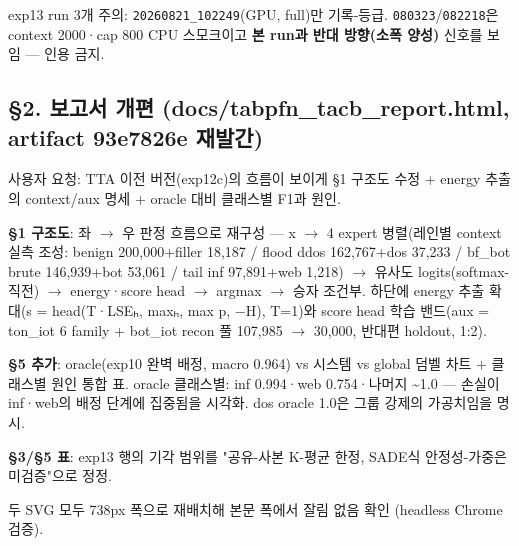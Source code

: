 exp13 run 3개 주의: \texttt{20260821\allowbreak{}\_\allowbreak{}\allowbreak{}102249}(GPU, full)만 기록-등급. \texttt{080323}/\allowbreak{}\texttt{082218}은 context 2000·cap 800 CPU 스모크이고 \textbf{본 run과 반대 방향(소폭 양성)} 신호를 보임 — 인용 금지.

\subsection{§2. 보고서 개편 (docs/\allowbreak{}tabpfn\_\allowbreak{}tacb\_\allowbreak{}report.html, artifact 93e7826e 재발간)}
사용자 요청: TTA 이전 버전(exp12c)의 흐름이 보이게 §1 구조도 수정 +\allowbreak{} energy 추출의 context/\allowbreak{}aux 명세 +\allowbreak{} oracle 대비 클래스별 F1과 원인.

\par\noindent \textbullet\enspace \textbf{§1 구조도}: 좌 \ensuremath{\rightarrow} 우 판정 흐름으로 재구성 — x  \ensuremath{\rightarrow}  4 expert 병렬(레인별 context 실측 조성: benign 200,000+\allowbreak{}filler 18,187 /\allowbreak{} flood ddos 162,767+\allowbreak{}dos 37,233 /\allowbreak{} bf\_\allowbreak{}bot brute 146,939+\allowbreak{}bot 53,061 /\allowbreak{} tail inf 97,891+\allowbreak{}web 1,218)  \ensuremath{\rightarrow}  유사도 logits(softmax-직전)  \ensuremath{\rightarrow}  energy·score head  \ensuremath{\rightarrow}  argmax  \ensuremath{\rightarrow}  승자 조건부. 하단에 energy 추출 확대(s =\allowbreak{} head(T·LSEₕ, maxₕ, max p, −H), T=\allowbreak{}1)와 score head 학습 밴드(aux =\allowbreak{} ton\_\allowbreak{}iot 6 family +\allowbreak{} bot\_\allowbreak{}iot recon 풀 107,985 \ensuremath{\rightarrow} 30,000, 반대편 holdout, 1:2).


\par\noindent \textbullet\enspace \textbf{§5 추가}: oracle(exp10 완벽 배정, macro 0.964) vs 시스템 vs global 덤벨 차트 +\allowbreak{} 클래스별 원인 통합 표. oracle 클래스별: inf 0.994·web 0.754·나머지 \textasciitilde{}1.0 — 손실이 inf·web의 배정 단계에 집중됨을 시각화. dos oracle 1.0은 그룹 강제의 가공치임을 명시.


\par\noindent \textbullet\enspace \textbf{§3/\allowbreak{}§5 표}: exp13 행의 기각 범위를 "공유-사본 K-평균 한정, SADE식 안정성-가중은 미검증"으로 정정.


\par\noindent \textbullet\enspace 두 SVG 모두 738px 폭으로 재배치해 본문 폭에서 잘림 없음 확인 (headless Chrome 검증).


